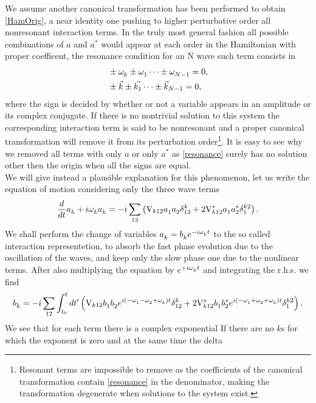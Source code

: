 We assume another canonical transformation has been performed to obtain \eqref{HamOrig}, a near identity one
pushing to higher perturbative order all nonresonant interaction terms. In the truly most general fashion all possible combinations of $a$ and $a^*$ 
would appear at each order in the Hamiltonian with proper coefficent, the resonance condition for an N wave such term consists in
\begin{align}
    &\pm \omega^{}_k \pm \omega^{}_1 \dots \pm \omega^{}_{N-1} = 0, \label{resonance}\\
    &\pm \vec{k} \pm \vec{k_1} \dots \pm \vec{k}_{N-1} = 0,
\end{align}
where the sign is decided by whether or not a variable appears in an amplitude or its complex conjugate. If there is no nontrivial solution to this system the corresponding 
interaction term is said to be nonresonant and a proper canonical transformation will remove it from its perturbation order\footnote{
    Resonant terms are impossible to remove as the coefficients of the canonical transformation contain \eqref{resonance} in the denominator,
making the transformation degenerate when solutions to the system exist.
}. It is easy to see why we removed all terms
with only $a$ or only $a^*$ as \eqref{resonance} surely has no solution other then the origin when all the signs are equal.\\
We will give instead a plausible explanation for this phenomenon, let us write the equation of motion considering only the three wave terms
\begin{equation}
    \frac{d}{dt} a_k^{} + i \omega^{}_k a_k^{} = -i\sum_{12} \left( \mathrm{V}_{k12} a_1^{} a_2^{} \delta^{k}_{12} + 2 \mathrm{V}^*_{k12}a_1^{} a_2^{*} \delta^{k2}_{1}  \right).
\end{equation}
We shall perform the change of variables $a_k^{} = b_k^{} e^{-i\omega^{}_k t}$ to the so called interaction representetion,
 to absorb the fast phase evolution due to the oscillation of the waves, and keep only the slow phase 
one due to the nonlinear terms. After also multiplying the equation by $e^{+i\omega^{}_k t}$ and integrating the r.h.s. we find
\begin{equation}
    b_k^{}= -i\sum_{12} \int_{t_0}^{t} dt'\left( \mathrm{V}_{k12} b_1^{} b_2^{}e^{i(-\omega^{}_1 - \omega^{}_2 + \omega^{}_k)t} \delta^{k}_{12} 
    + 2 \mathrm{V}^*_{k12}b_1^{} b_2^{*}e^{i(-\omega^{}_1 + \omega^{}_2 + \omega^{}_k)t} \delta^{k2}_{1}  \right).
\end{equation}
We see that for each term there is a complex exponential If there are no $k$s for which the exponent is zero and at the same time the delta
